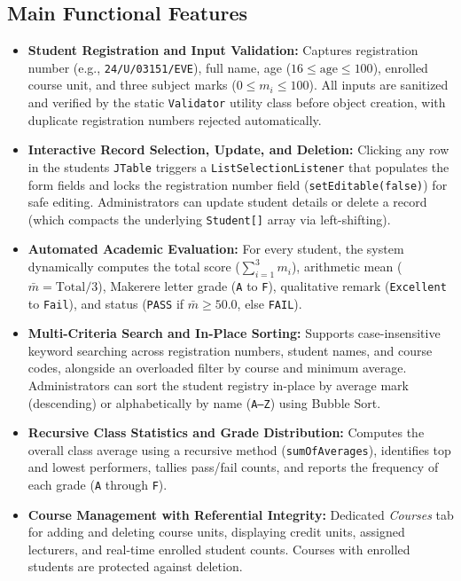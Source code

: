 \documentclass[10pt,a4paper]{article}
\begin{document}
\subsection{Main Functional Features}
\begin{itemize}[leftmargin=0.4cm, itemsep=0pt, topsep=0.5pt]
    \item \textbf{Student Registration and Input Validation:} Captures registration number (e.g., \texttt{24/U/03151/EVE}), full name, age ($16 \le \text{age} \le 100$), enrolled course unit, and three subject marks ($0 \le m_i \le 100$). All inputs are sanitized and verified by the static \texttt{Validator} utility class before object creation, with duplicate registration numbers rejected automatically.
    \item \textbf{Interactive Record Selection, Update, and Deletion:} Clicking any row in the students \texttt{JTable} triggers a \texttt{ListSelectionListener} that populates the form fields and locks the registration number field (\texttt{setEditable(false)}) for safe editing. Administrators can update student details or delete a record (which compacts the underlying \texttt{Student[]} array via left-shifting).
    \item \textbf{Automated Academic Evaluation:} For every student, the system dynamically computes the total score ($\sum_{i=1}^{3} m_i$), arithmetic mean ($\bar{m} = \text{Total}/3$), Makerere letter grade (\texttt{A} to \texttt{F}), qualitative remark (\texttt{Excellent} to \texttt{Fail}), and status (\texttt{PASS} if $\bar{m} \ge 50.0$, else \texttt{FAIL}).
    \item \textbf{Multi-Criteria Search and In-Place Sorting:} Supports case-insensitive keyword searching across registration numbers, student names, and course codes, alongside an overloaded filter by course and minimum average. Administrators can sort the student registry in-place by average mark (descending) or alphabetically by name (\texttt{A--Z}) using Bubble Sort.
    \item \textbf{Recursive Class Statistics and Grade Distribution:} Computes the overall class average using a recursive method (\texttt{sumOfAverages}), identifies top and lowest performers, tallies pass/fail counts, and reports the frequency of each grade (\texttt{A} through \texttt{F}).
    \item \textbf{Course Management with Referential Integrity:} Dedicated \textit{Courses} tab for adding and deleting course units, displaying credit units, assigned lecturers, and real-time enrolled student counts. Courses with enrolled students are protected against deletion.
\end{itemize}
\end{document}
